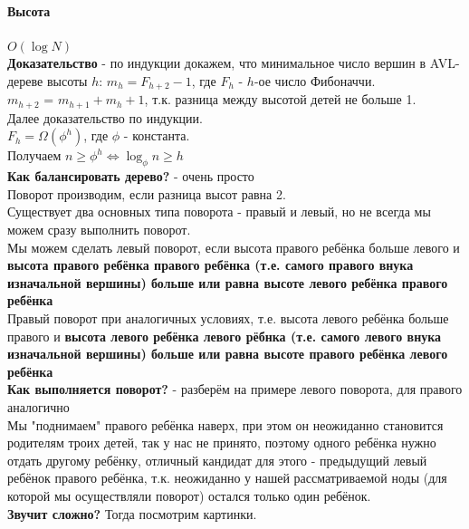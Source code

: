 \documentclass[a4paper,10pt]{article}
\begin{document}
	\paragraph{Высота} $O(\log N)$ \\
	\textbf{Доказательство} - по индукции докажем, что минимальное число вершин в AVL-дереве высоты $h$: $m_{h} = F_{h+2} - 1$, где $F_{h}$ - $h$-ое число Фибоначчи. \\
	$m_{h+2}$ = $m_{h+1} + m_{h} + 1$, т.к. разница между высотой детей не больше 1. \\
	Далее доказательство по индукции.\\
	$F_{h} = \Omega(\phi^{h})$, где $\phi$ - константа. \\
	Получаем $n \geq \phi^{h} \Leftrightarrow \log_{\phi} n \geq h$ \\
	
	\textbf{Как балансировать дерево?} - очень просто \\
	Поворот производим, если разница высот равна 2. \\
	Существует два основных типа поворота - правый и левый, но не всегда мы можем сразу выполнить поворот. \\
	Мы можем сделать левый поворот, если высота правого ребёнка больше левого и \textbf{высота правого ребёнка правого ребёнка (т.е. самого правого внука изначальной вершины) больше или равна высоте левого ребёнка правого ребёнка} \\
	Правый поворот при аналогичных условиях, т.е. высота левого ребёнка больше правого и \textbf{высота левого ребёнка левого рёбнка (т.е. самого левого внука изначальной вершины) больше или равна высоте правого ребёнка левого ребёнка} \\
	\textbf{Как выполняется поворот?} - разберём на примере левого поворота, для правого аналогично \\
	Мы "поднимаем" правого ребёнка наверх, при этом он неожиданно становится родителям троих детей, так у нас не принято, поэтому одного ребёнка нужно отдать другому ребёнку, отличный кандидат для этого - предыдущий левый ребёнок правого ребёнка, т.к. неожиданно у нашей рассматриваемой ноды (для которой мы осуществляли поворот) остался только один ребёнок. \\
	
	\textbf{Звучит сложно?} Тогда посмотрим картинки. \\
	
\end{document}
